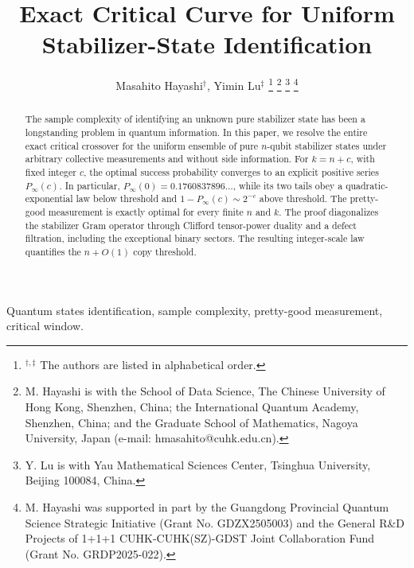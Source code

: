 \documentclass[journal,twocolumn]{IEEEtran}
\theoremstyle{definition}
\theoremstyle{plain}
\begin{document}
\title{Exact Critical Curve for Uniform Stabilizer-State Identification}
\author{Masahito Hayashi$^\dagger$, Yimin Lu$^{\ddagger}$
\thanks{$^{\dagger,\ddagger}$ The authors are listed in alphabetical order.}
\thanks{M. Hayashi is with the School of Data Science, The Chinese University
of Hong Kong, Shenzhen, China; the International Quantum Academy, Shenzhen,
China; and the Graduate School of Mathematics, Nagoya University, Japan
(e-mail: hmasahito@cuhk.edu.cn).}%
\thanks{Y. Lu is with 
Yau Mathematical Sciences Center, Tsinghua University,
Beijing 100084, China.}%
\thanks{M. Hayashi was supported in part by the Guangdong Provincial Quantum
Science Strategic Initiative (Grant No. GDZX2505003) and the General R\&D
Projects of 1+1+1 CUHK-CUHK(SZ)-GDST Joint Collaboration Fund (Grant No.
GRDP2025-022).}}

\maketitle

\begin{abstract}
The sample complexity of identifying an unknown pure stabilizer state has been a longstanding problem in quantum information. In this paper, we resolve the entire exact critical crossover for the uniform ensemble of pure $n$-qubit stabilizer states under
arbitrary collective measurements and without side information.  For
$k=n+c$, with fixed integer $c$, the optimal success probability converges to
an explicit positive series $P_{\infty}(c)$.  In particular,
$P_{\infty}(0)=0.1760837896\ldots$, while its two tails obey a
quadratic-exponential law below threshold and
$1-P_{\infty}(c)\sim2^{-c}$ above threshold.  The pretty-good measurement is
exactly optimal for every finite $n$ and $k$.  The proof diagonalizes the
stabilizer Gram operator through Clifford tensor-power duality and a defect
filtration, including the exceptional binary sectors.  The resulting
integer-scale law quantifies the $n+O(1)$ copy threshold.
\end{abstract}

\begin{IEEEkeywords}
Quantum states identification, sample complexity, pretty-good measurement, critical window.
\end{IEEEkeywords}
\end{document}
